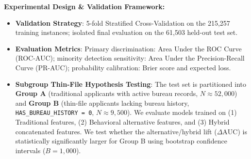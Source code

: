 \documentclass[10pt,letterpaper]{article}
\begin{document}
\vspace{1pt}
\noindent{}
\vspace{2pt}

\textbf{Experimental Design \& Validation Framework:}
\begin{itemize}\setlength{\itemsep}{1.5pt}\setlength{\parskip}{0pt}
    \item \textbf{Validation Strategy}: 5-fold Stratified Cross-Validation on the 215,257 training instances; isolated final evaluation on the 61,503 held-out test set.
    \item \textbf{Evaluation Metrics}: Primary discrimination: Area Under the ROC Curve (ROC-AUC); minority detection sensitivity: Area Under the Precision-Recall Curve (PR-AUC); probability calibration: Brier score and expected loss.
    \item \textbf{Subgroup Thin-File Hypothesis Testing}: The test set is partitioned into \textbf{Group A} (traditional applicants with active bureau records, $N \approx 52,000$) and \textbf{Group B} (thin-file applicants lacking bureau history, \texttt{HAS\_BUREAU\_HISTORY = 0}, $N \approx 9,500$). We evaluate models trained on (1) Traditional features, (2) Behavioral alternative features, and (3) Hybrid concatenated features. We test whether the alternative/hybrid lift ($\Delta\text{AUC}$) is statistically significantly larger for Group B using bootstrap confidence intervals ($B = 1,000$).
\end{itemize}
\end{document}

